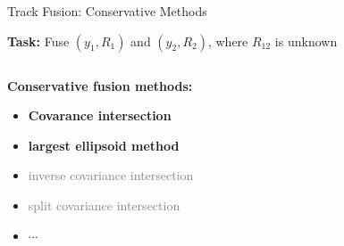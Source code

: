 \documentclass[aspectratio=1610]{beamer}
\begin{document}
\begin{frame}{Track Fusion: Conservative Methods}

\textbf{Task:} Fuse $(y_1,R_1)$ and $(y_2,R_2)$, where $R_{12}$ is unknown

\vspace{2em}

\begin{columns}

\begin{column}{0.475\textwidth}

\textbf{Conservative fusion methods:}
\begin{itemize}
    \item \textcolor{clrci}{\textbf{Covarance intersection}}
    \item \textcolor{clrle}{\textbf{largest ellipsoid method}}
    \item \textcolor{gray}{inverse covariance intersection}
    \item \textcolor{gray}{split covariance intersection}
    \item $\cdots$
\end{itemize}

\end{column}

\begin{column}{0.475\textwidth}
\begin{figure}
    \begin{tikzpicture}[scale=0.75]
        
    \end{tikzpicture}
\end{figure}
\end{column}

\end{columns}

\end{frame}
\end{document}
